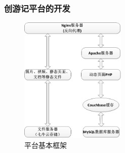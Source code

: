 \documentclass{beamer}
\begin{document}
\begin{frame}
  \frametitle{创游记平台的开发}
  \begin{figure}
    \centering
      \includegraphics[height=6cm]{./img/web_frame2.png}
    \caption{平台基本框架}
    \label{fig:visual}
  \end{figure}
\end{frame}
\end{document}
